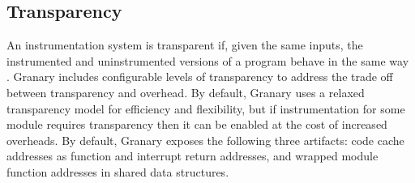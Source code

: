 \documentclass[preprint]{sigplanconf}
\begin{document}



\subsection{Transparency}\label{sec:transparency}

An instrumentation system is transparent if, given the same inputs, the instrumented and uninstrumented versions of a program behave in the same way \cite{Transparency}. Granary includes configurable levels of transparency to address the trade off between transparency and overhead. By default, Granary uses a relaxed transparency model for efficiency and flexibility, but if instrumentation for some module requires transparency then it can be enabled at the cost of increased overheads. By default, Granary exposes the following three artifacts: code cache addresses as function and interrupt return addresses, and wrapped module function addresses in shared data structures.
\end{document}
